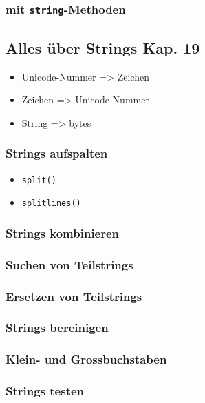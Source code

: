 \subsubsection{mit \texttt{string}-Methoden}


\subsection{Alles über Strings \tiny{Kap. 19}}
\begin{itemize}
	\item Unicode-Nummer => Zeichen
	
	\item Zeichen => Unicode-Nummer
	
	\item String => bytes
	
\end{itemize}

\subsubsection{Strings aufspalten}
\begin{itemize}
	\item \texttt{split()}
	
	\item \texttt{splitlines()}
	
\end{itemize}

\subsubsection{Strings kombinieren}


\subsubsection{Suchen von Teilstrings}


\subsubsection{Ersetzen von Teilstrings}


\subsubsection{Strings bereinigen}


\subsubsection{Klein- und Grossbuchstaben}


\subsubsection{Strings testen}


